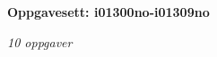\centerline{\bf Oppgavesett: i01300no-i01309no}
\vskip 10pt
\centerline{\it 10 oppgaver}\vskip 10pt
\vskip 10pt
